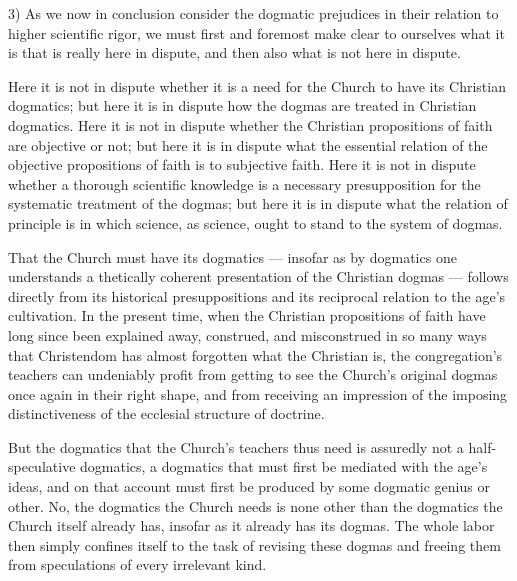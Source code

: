 \documentclass[12pt,a4paper]{book}
\begin{document}
3) As we now in conclusion consider the dogmatic prejudices in their relation to higher
scientific rigor, we must first and foremost make clear to ourselves what it is that is really
here in dispute, and then also what is not here in dispute.

Here it is not in dispute whether it is a need for the Church to have its Christian dogmatics; but
here it is in dispute how the dogmas are treated in Christian dogmatics. Here it is not in
dispute whether the Christian propositions of faith are objective or not; but here it is in
dispute what the essential relation of the objective propositions of faith is to subjective
faith. Here it is not in dispute whether a thorough scientific knowledge is a necessary
presupposition for the systematic treatment of the dogmas; but here it is in dispute what the
relation of principle is in which science, as science, ought to stand to the system of dogmas.

That the Church must have its dogmatics --- insofar as by dogmatics one understands a thetically
coherent presentation of the Christian dogmas --- follows directly from its historical
presuppositions and its reciprocal relation to the age's cultivation. In the present time, when
the Christian propositions of faith have long since been explained away, construed, and
misconstrued in so many ways that Christendom has almost forgotten what the Christian is, the
congregation's teachers can undeniably profit from getting to see the Church's original dogmas
once again in their right shape, and from receiving an impression of the imposing distinctiveness
of the ecclesial structure of doctrine.

But the dogmatics that the Church's teachers thus need is assuredly not a half-speculative
dogmatics, a dogmatics that must first be mediated with the age's ideas, and on that account must
first be produced by some dogmatic genius or other. No, the
dogmatics the Church needs is none other than the dogmatics the Church itself already has,
insofar as it already has its dogmas. The whole labor then simply confines itself to the task of
revising these dogmas and freeing them from speculations of every irrelevant kind.
\end{document}
